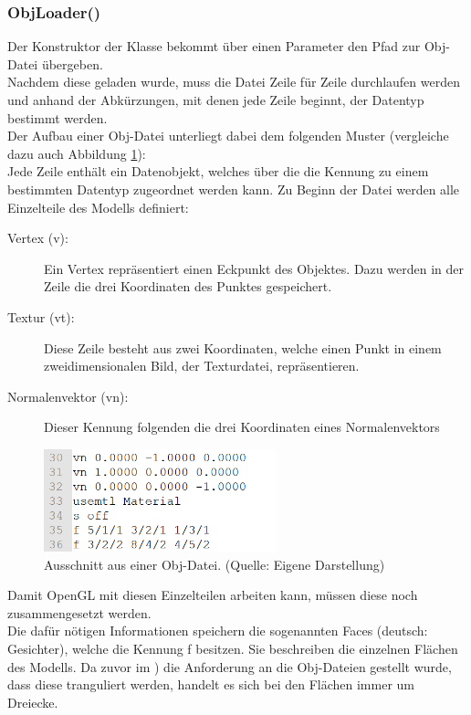\subsubsection{ObjLoader()}
Der Konstruktor der Klasse bekommt über einen Parameter den Pfad zur Obj-Datei übergeben. \\
Nachdem diese geladen wurde, muss die Datei Zeile für Zeile durchlaufen werden und anhand der Abkürzungen, mit denen jede Zeile beginnt, der Datentyp bestimmt werden. \\
Der Aufbau einer Obj-Datei unterliegt dabei dem folgenden Muster (vergleiche dazu auch Abbildung \ref{fig:obj-datei}):\\
Jede Zeile enthält ein Datenobjekt, welches über die die Kennung zu einem bestimmten Datentyp zugeordnet werden kann. 
Zu Beginn der Datei werden alle Einzelteile des Modells definiert:
\begin{description}
\item[Vertex (v):] Ein Vertex repräsentiert einen Eckpunkt des Objektes. Dazu werden in der Zeile die drei Koordinaten des Punktes gespeichert.
\item[Textur (vt):] Diese Zeile besteht aus zwei Koordinaten, welche einen Punkt in einem zweidimensionalen Bild, der Texturdatei, repräsentieren.
\item[Normalenvektor (vn):] Dieser Kennung folgenden die drei Koordinaten eines Normalenvektors  
\end{description}
\begin{figure}
\centering
\includegraphics[width=0.6\textwidth]{Abbildungen/obj-datei.png}
\caption[Obj-Dateiformat]{Ausschnitt aus einer Obj-Datei. (Quelle: Eigene Darstellung)}
\label{fig:obj-datei}
\end{figure}
Damit OpenGL mit diesen Einzelteilen arbeiten kann, müssen diese noch zusammengesetzt werden. \\
Die dafür nötigen Informationen speichern die sogenannten Faces (deutsch: \glqq Gesichter\grqq ), welche die Kennung f besitzen. Sie beschreiben die einzelnen Flächen des Modells. Da zuvor im ) die Anforderung an die Obj-Dateien gestellt wurde, dass diese tranguliert werden, handelt es sich bei den Flächen immer um Dreiecke. \\ 
